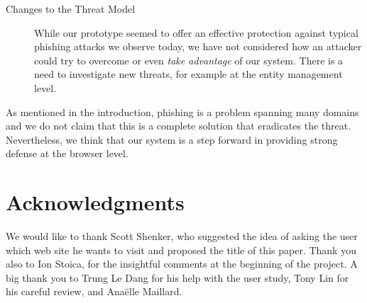 \documentclass[11pt,styles/chicago]{article}
\begin{document}
\begin{description}
\item[Changes to the Threat Model] While our prototype seemed to offer an effective protection against typical phishing attacks we observe today, we have not considered how an attacker could try to overcome or even \emph{take advantage} of our system. There is a need to investigate new threats, for example at the entity management level. 

\end{description}

As mentioned in the introduction, phishing is a problem spanning many domains and we do not claim that this is a complete solution that eradicates the threat. Nevertheless, we think that our system is a step forward in providing strong defense at the browser level.

\section*{Acknowledgments}
We would like to thank Scott Shenker, who suggested the idea of asking the user which web site he wants to visit and proposed the title of this paper. Thank you also to Ion Stoica, for the insightful comments at the beginning of the project. A big thank you to Trung Le Dang for his help with the user study, Tony Lin for his careful review, and Ana\"elle Maillard.


\end{document}
